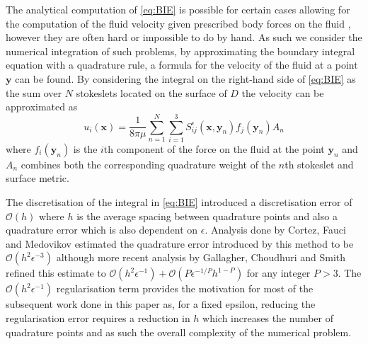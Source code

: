 The analytical computation of \cref{eq:BIE} is possible for certain cases allowing for the computation of the fluid velocity given prescribed body forces on the fluid \cite{Walker2020AFilaments,Zhao2021RegularizedFlow,Ohm2021RemarksTheory,Zhao2019}, however they are often hard or impossible to do by hand. As such we consider the numerical integration of such problems, by approximating the boundary integral equation with a quadrature rule, a formula for the velocity of the fluid at a point $\bm{y}$ can be found. By considering the integral on the right-hand side of \cref{eq:BIE} as the sum over $N$ stokeslets located on the surface of $D$ the velocity can be approximated as
\begin{equation}
\label{eq:Stokesletsum}
    u_{i}\left(\bm{x}\right)=\frac{1}{8 \pi \mu} \sum_{n=1}^{N} \sum_{i=1}^{3} S_{i j}^{\epsilon}\left(\bm{x}, {\bm{y}}_{n}\right) {f}_{j}({\bm{y}}_{n}) A_{n}
\end{equation}
where ${f}_{i}({\bm{y}}_n)$ is the $i$th component of the force on the fluid at the point ${\bm{y}}_n$ and $A_n$ combines both the corresponding quadrature weight of the $n$th stokeslet and surface metric.

The discretisation of the integral in \cref{eq:BIE} introduced a discretisation error of $\mathcal{O}(h)$ where $h$ is the average spacing between quadrature points and also a quadrature error which is also dependent on $\epsilon$. Analysis done by Cortez, Fauci and Medovikov \cite{Cortez2005} estimated the quadrature error introduced by this method to be $\mathcal{O}(h^2\epsilon^{-3})$ although more recent analysis by Gallagher, Choudhuri and Smith \cite{Gallagher2019SharpEquation} refined this estimate to $\mathcal{O}(h^2\epsilon^{-1}) + \mathcal{O}(P\epsilon^{-1/P} h^{1-P})$ for any integer $P>3$. The $\mathcal{O}(h^2\epsilon^{-1})$ regularisation term provides the motivation for most of the subsequent work done in this paper as, for a fixed epsilon, reducing the regularisation error requires a reduction in $h$ which increases the number of quadrature points and as such the overall complexity of the numerical problem. 

